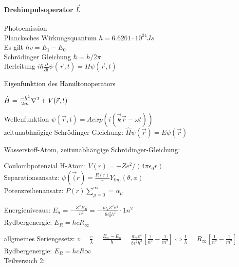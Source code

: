 \documentclass[12pt,oneside,oldfontcommands]{memoir}
\begin{document}
\paragraph{Drehimpulsoperator $\vec{L}$}


Photoemission\\
Plancksches Wirkungsquantum $h = 6.6261 \cdot 10^{34} Js$ \\
Es gilt $hv=E_1-E_0$\\

Schrödinger Gleichung $\hbar = h/2\pi$\\

Herleitung
$i \hbar \frac{\partial}{\partial t} \psi(\vec{r},t) = H \psi(\vec{r},t)$

Eigenfunktion des Hamiltonoperators

$\hat{H} = \frac{-\hbar^2}{2m} \nabla^2 + V(\vec{r},t)\\$

Wellenfunktion
$\psi(\vec{r},t) = A exp(i(\vec{k}\vec{r} - \omega t))$ \\
zeitunabhnägige Schrödinger-Gleichung: $\hat{H} \psi (\vec{r}) = E \psi(\vec{r})$

Wasserstoff-Atom, zeitunabhängige Schrödinger-Gleichung:  %

Coulombpotenzial H-Atom: $V(r) = -Z e^2 / (4 \pi \epsilon_0 r)$\\

Separationsansatz: $\psi(\vec(r) = \frac{R(r)}{r}Y_{lm_l}(\theta, \phi)$\\

Potenzreihenansatz: $P(r) \sum^\infty_{\mu = 0} = \alpha_{\mu}$

Energieniveaus: $E_n = -\frac{Z^2 E_R}{n^2} = - \frac{m_e Z^2 e^4}{8 \epsilon^2_0 h^2} \cdot {1}{n^2}$ \\

Rydbergenergie: $E_R = hcR_{\infty}$

allgmeines Seriengesetz: $v = \frac{c}{\lambda} = \frac{E_m - E_n}{h} = \frac{m_e e^4}{8 \epsilon_0^2 h^3} [\frac{1}{n^2} - \frac{1}{m^2}] \Longleftrightarrow \frac{1}{\lambda} = R_\infty [\frac{1}{n^2} - \frac{1}{m^2}]$\\

Rydbergenergie: $E_R = hcR\infty$\\

Teilversuch 2:
\end{document}
